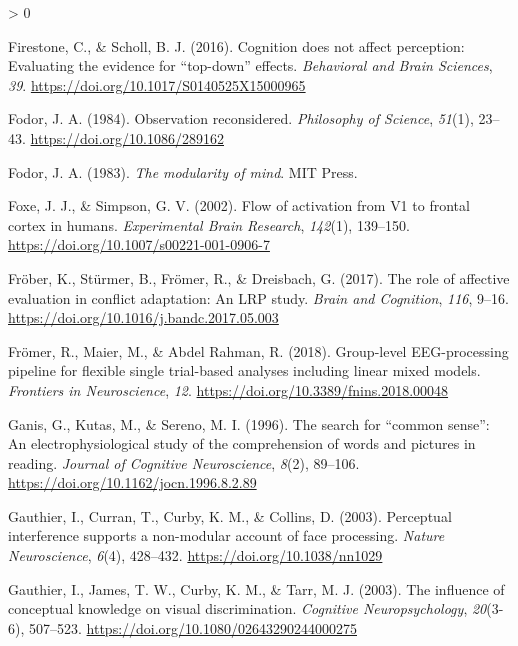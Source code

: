 \documentclass[
  english,
  doc,12pt,twoside,floatsintext]{apa7}
\newlength{\cslhangindent}
\newenvironment{CSLReferences}[2] %
 {%
  \setlength{\parindent}{0pt}
  \ifodd #1 \everypar{\setlength{\hangindent}{\cslhangindent}}\ignorespaces\fi
  \ifnum #2 > 0
  \setlength{\parskip}{#2\baselineskip}
  \fi
 }%
 {}
\begin{document}
\begin{CSLReferences}{1}{0}
\leavevmode\hypertarget{ref-firestone2016}{}%
Firestone, C., \& Scholl, B. J. (2016). Cognition does not affect perception: Evaluating the evidence for {``top-down''} effects. \emph{Behavioral and Brain Sciences}, \emph{39}. \url{https://doi.org/10.1017/S0140525X15000965}

\leavevmode\hypertarget{ref-fodor1984}{}%
Fodor, J. A. (1984). Observation reconsidered. \emph{Philosophy of Science}, \emph{51}(1), 23--43. \url{https://doi.org/10.1086/289162}

\leavevmode\hypertarget{ref-fodor1983}{}%
Fodor, J. A. (1983). \emph{The modularity of mind}. MIT Press.

\leavevmode\hypertarget{ref-foxe2002}{}%
Foxe, J. J., \& Simpson, G. V. (2002). Flow of activation from {V1} to frontal cortex in humans. \emph{Experimental Brain Research}, \emph{142}(1), 139--150. \url{https://doi.org/10.1007/s00221-001-0906-7}

\leavevmode\hypertarget{ref-fruxf6ber2017}{}%
Fröber, K., Stürmer, B., Frömer, R., \& Dreisbach, G. (2017). The role of affective evaluation in conflict adaptation: An {LRP} study. \emph{Brain and Cognition}, \emph{116}, 9--16. \url{https://doi.org/10.1016/j.bandc.2017.05.003}

\leavevmode\hypertarget{ref-fruxf6mer2018}{}%
Frömer, R., Maier, M., \& Abdel Rahman, R. (2018). Group-level {EEG}-processing pipeline for flexible single trial-based analyses including linear mixed models. \emph{Frontiers in Neuroscience}, \emph{12}. \url{https://doi.org/10.3389/fnins.2018.00048}

\leavevmode\hypertarget{ref-ganis1996}{}%
Ganis, G., Kutas, M., \& Sereno, M. I. (1996). The search for {``common sense''}: An electrophysiological study of the comprehension of words and pictures in reading. \emph{Journal of Cognitive Neuroscience}, \emph{8}(2), 89--106. \url{https://doi.org/10.1162/jocn.1996.8.2.89}

\leavevmode\hypertarget{ref-gauthier2003a}{}%
Gauthier, I., Curran, T., Curby, K. M., \& Collins, D. (2003). Perceptual interference supports a non-modular account of face processing. \emph{Nature Neuroscience}, \emph{6}(4), 428--432. \url{https://doi.org/10.1038/nn1029}

\leavevmode\hypertarget{ref-gauthier2003}{}%
Gauthier, I., James, T. W., Curby, K. M., \& Tarr, M. J. (2003). The influence of conceptual knowledge on visual discrimination. \emph{Cognitive Neuropsychology}, \emph{20}(3-6), 507--523. \url{https://doi.org/10.1080/02643290244000275}


\end{CSLReferences}
\end{document}

